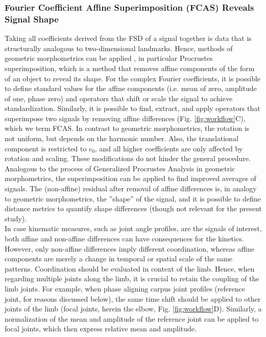 \subsubsection{Fourier Coefficient Affine Superimposition (FCAS) Reveals Signal Shape}
Taking all coefficients derived from the FSD of a signal together is data that is structurally analogous to two-dimensional landmarks.
Hence, methods of geometric morphometrics can be applied \citep{Bookstein1991,Kendall1989,Gower1975,Dryden2016}, in particular Procrustes superimposition, which is a method that removes affine components of the form of an object to reveal its shape.
For the complex Fourier coefficients, it is possible to define standard values for the affine components (i.e. mean of zero, amplitude of one, phase zero) and operators that shift or scale the signal to achieve standardization.
Similarly, it is possible to find, extract, and apply operators that superimpose two signals by removing affine differences (Fig. \ref{fig:workflow}C), which we term FCAS.
In contrast to geometric morphometrics, the rotation is not uniform, but depends on the harmonic number.
Also, the translational component is restricted to $c_{0}$, and all higher coefficients are only affected by rotation and scaling.
These modifications do not hinder the general procedure.
Analogous to the process of Generalized Procrustes Analysis in geometric morphometrics, the superimposition can be applied to find improved averages of signals.
The (non-affine) residual after removal of affine differences is, in analogy to geometric morphometrics, the ''shape'' of the signal, and it is possible to define distance metrics to quantify shape differences (though not relevant for the present study).
\\In case kinematic measures, such as joint angle profiles, are the signals of interest, both affine and non-affine differences can have consequences for the kinetics.
However, only non-affine differences imply different coordination, whereas affine components are merely a change in temporal or spatial scale of the same patterns.
Coordination should be evaluated in context of the limb.
Hence, when regarding multiple joints along the limb, it is crucial to retain the coupling of the limb joints.
For example, when phase aligning carpus joint profiles (reference joint, for reasons discussed below), the same time shift should be applied to other joints of the limb (focal joints, herein the elbow, Fig. \ref{fig:workflow}D).
Similarly, a normalization of the mean and amplitude of the reference joint can be applied to focal joints, which then express relative mean and amplitude.
